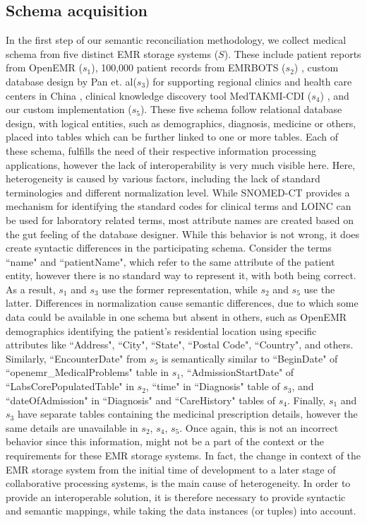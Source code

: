 \subsection*{Schema acquisition}
\label{schema_acq}
In the first step of our semantic reconciliation methodology, we collect medical schema from five distinct EMR storage systems ($S$). These include patient reports from OpenEMR ($s_1$), 100,000 patient records from EMRBOTS ($s_2$) \cite{kartoun2016methodology}, custom database design by Pan et. al($s_3$) for supporting regional clinics and health care centers in China \cite{pan2016design}, clinical knowledge discovery tool MedTAKMI-CDI ($s_4$) \cite{inokuchi2007medtakmi}, and our custom implementation ($s_5$). These five schema follow relational database design, with logical entities, such as demographics, diagnosis, medicine or others, placed into tables which can be further linked to one or more tables. Each of these schema, fulfills the need of their respective information processing applications, however the lack of interoperability is very much visible here. Here, heterogeneity is caused by various factors, including the lack of standard terminologies and different normalization level.
While SNOMED-CT provides a mechanism for identifying the standard codes for clinical terms and LOINC can be used for laboratory related terms, most attribute names are created based on the gut feeling of the database designer. While this behavior is not wrong, it does create syntactic differences in the participating schema. Consider the terms ``name" and ``patientName", which refer to the same attribute of the patient entity, however there is no standard way to represent it, with both being correct. As a result, $s_1$ and $s_3$ use the former representation, while $s_2$ and $s_5$ use the latter. 
Differences in normalization cause semantic differences, due to which some data could be available in one schema but absent in others, such as OpenEMR demographics identifying the patient's residential location using specific attributes like ``Address", ``City", ``State", ``Postal Code", ``Country", and others. Similarly, ``EncounterDate" from $s_5$ is semantically similar to ``BeginDate" of ``openemr\_MedicalProblems" table in $s_1$, ``AdmissionStartDate" of ``LabsCorePopulatedTable" in $s_2$, 
``time" in ``Diagnosis" table of $s_3$, and  ``dateOfAdmission" in ``Diagnosis" and ``CareHistory" tables of $s_4$.
Finally, $s_1$ and $s_3$ have separate tables containing the medicinal prescription details, however the same details are unavailable in $s_2$, $s_4$, $s_5$. Once again, this is not an incorrect behavior since this information, might not be a part of the context or the requirements for these EMR storage systems.
In fact, the change in context of the EMR storage system from the initial time of development to a later stage of collaborative processing systems, is the main cause of heterogeneity.
In order to provide an interoperable solution, it is therefore necessary to provide syntactic and semantic mappings, while taking the data instances (or tuples) into account.

